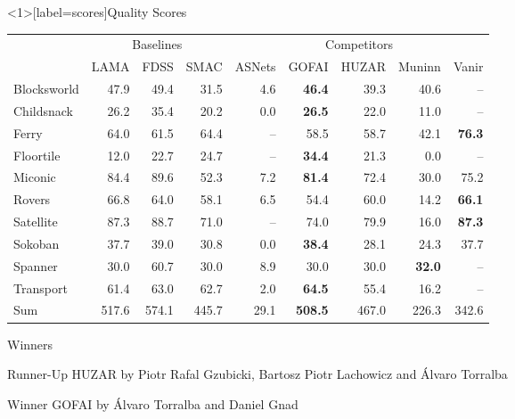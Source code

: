 \documentclass[aspectratio=169,xcolor=dvipsnames]{beamer}
\begin{document}
\begin{frame}<1>[label=scores]{Quality Scores}
    \centering
    \newcommand{\numtasks}[1]{}
    \setlength{\tabcolsep}{0.5em}
    \begin{tabular}{@{}lrrrrrrrr@{}}
        & \multicolumn{3}{c}{Baselines} & \multicolumn{5}{c}{Competitors} \\
        \cmidrule(r){2-4}
        \cmidrule(l){5-9}
         & LAMA & FDSS & SMAC & ASNets & GOFAI & HUZAR & Muninn & Vanir \\
        \midrule
        Blocksworld & 47.9 & 49.4 & 31.5 & 4.6 & \textbf{46.4} & 39.3 & 40.6 & -- \\
        Childsnack  & 26.2 & 35.4 & 20.2 & 0.0 & \textbf{26.5} & 22.0 & 11.0 & -- \\
        Ferry       & 64.0 & 61.5 & 64.4 & -- & 58.5 & 58.7 & 42.1 & \textbf{76.3} \\
        Floortile   & 12.0 & 22.7 & 24.7 & -- & \textbf{34.4} & 21.3 & 0.0 & -- \\
        Miconic     & 84.4 & 89.6 & 52.3 & 7.2 & \textbf{81.4} & 72.4 & 30.0 & 75.2 \\
        Rovers      & 66.8 & 64.0 & 58.1 & 6.5 & 54.4 & 60.0 & 14.2 &  \textbf{66.1} \\
        Satellite   & 87.3 & 88.7 & 71.0 & -- & 74.0 & 79.9 & 16.0 & \textbf{87.3} \\
        Sokoban     & 37.7 & 39.0 & 30.8 & 0.0 & \textbf{38.4} & 28.1 & 24.3 & 37.7 \\
        Spanner     & 30.0 & 60.7 & 30.0 & 8.9 & 30.0 & 30.0 & \textbf{32.0} & -- \\
        Transport   & 61.4 & 63.0 & 62.7 & 2.0 & \textbf{64.5} & 55.4 & 16.2 & -- \\
        \midrule
        Sum     & 517.6 & 574.1 & 445.7 & 29.1 & \textbf{508.5} & 467.0 & 226.3 & 342.6 \\
        \end{tabular}
\end{frame}

\begin{frame}{Winners}

    \begin{block}{Runner-Up}
        \alert{HUZAR} by Piotr Rafal Gzubicki, Bartosz Piotr Lachowicz and Álvaro Torralba
    \end{block}

    \bigskip

    \begin{block}{Winner}
        \alert{GOFAI} by Álvaro Torralba and Daniel Gnad
    \end{block}
\end{frame}
\end{document}
